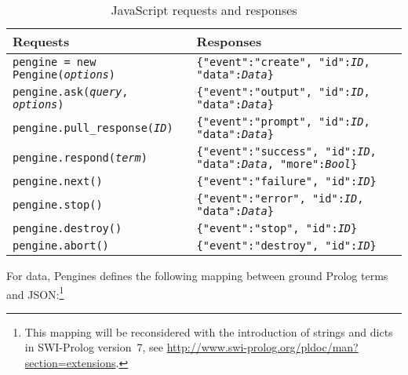 \documentclass{new_tlp}
\begin{document}
\begin{table}[h]
  \caption{JavaScript requests and responses}
  \label{js-table}
  \begin{minipage}{\textwidth}
    \begin{tabular}{ll}
      \hline\hline
      Requests& Responses\\
      \hline
      \texttt{pengine = new Pengine(\textit{options})}& \texttt{\{"event":"create", "id":\textit{ID}, "data":\textit{Data}\}}              \\
      \texttt{pengine.ask(\textit{query}, \textit{options})}   & \texttt{\{"event":"output", "id":\textit{ID}, "data":\textit{Data}\}}              \\
      \texttt{pengine.pull\_response(\textit{ID})}    & \texttt{\{"event":"prompt", "id":\textit{ID}, "data":\textit{Data}\}}              \\
      \texttt{pengine.respond(\textit{term})}           & \texttt{\{"event":"success", "id":\textit{ID}, "data":\textit{Data}, "more":\textit{Bool}\}}\\
      \texttt{pengine.next()}                & \texttt{\{"event":"failure", "id":\textit{ID}\}}                          \\
      \texttt{pengine.stop()}                & \texttt{\{"event":"error", "id":\textit{ID}, "data":\textit{Data}\}}               \\
      \texttt{pengine.destroy()}             & \texttt{\{"event":"stop", "id":\textit{ID}\}}                             \\
      \texttt{pengine.abort()}               & \texttt{\{"event":"destroy", "id":\textit{ID}\}}                          \\
      \hline\hline
    \end{tabular}
    \vspace{-2\baselineskip}
  \end{minipage}
\end{table}

For data, Pengines defines the following mapping between  ground Prolog terms and
JSON:\footnote{This mapping will be reconsidered with the introduction
of strings and dicts in SWI-Prolog version~7, see \url{http://www.swi-prolog.org/pldoc/man?section=extensions}.}
\end{document}
